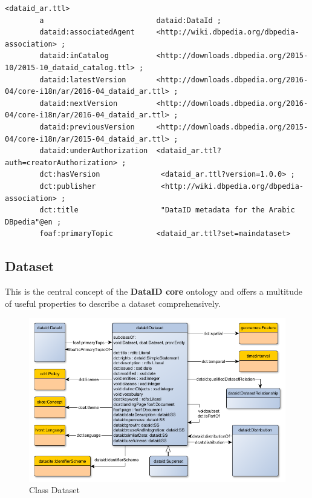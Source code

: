 \documentclass[a4paper,english,twoside,BCOR1.5cm,headsepline,DIV12,appendixprefix,final,12pt]{scrbook}
\newcommand{\core}{{\ttfamily\bfseries DataID core}\xspace}
\begin{document}
\pagebreak
\begin{lstlisting}[language=ttl, captionpos=b,caption=Instance of a DataId,label=lst:coredataid,linewidth=\columnwidth,breaklines=true]
<dataid_ar.ttl>
        a                          dataid:DataId ;
        dataid:associatedAgent     <http://wiki.dbpedia.org/dbpedia-association> ;
        dataid:inCatalog           <http://downloads.dbpedia.org/2015-10/2015-10_dataid_catalog.ttl> ;            
        dataid:latestVersion       <http://downloads.dbpedia.org/2016-04/core-i18n/ar/2016-04_dataid_ar.ttl> ;
        dataid:nextVersion         <http://downloads.dbpedia.org/2016-04/core-i18n/ar/2016-04_dataid_ar.ttl> ;    
        dataid:previousVersion     <http://downloads.dbpedia.org/2015-04/core-i18n/ar/2015-04_dataid_ar.ttl> ;
        dataid:underAuthorization  <dataid_ar.ttl?auth=creatorAuthorization> ;                                    
        dct:hasVersion              <dataid_ar.ttl?version=1.0.0> ;
        dct:publisher               <http://wiki.dbpedia.org/dbpedia-association> ;                                
        dct:title                   "DataID metadata for the Arabic DBpedia"@en ;
        foaf:primaryTopic          <dataid_ar.ttl?set=maindataset>
\end{lstlisting}

\subsection{Dataset} 
\label{sec:coredataset}
This is the central concept of the \core ontology and offers a multitude of useful properties to describe a dataset comprehensively.
\begin{figure}[!htbp]
\centering
  \includegraphics[width=\textwidth]{images/ClassDataset.png}
  \caption{Class Dataset}
  \label{fig:example}
\end{figure}
\end{document}
